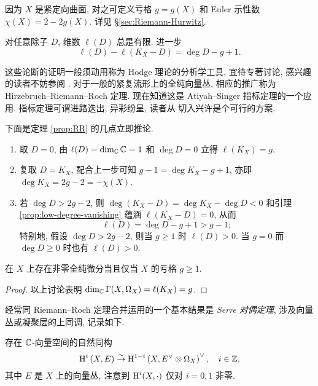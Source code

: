 因为 $X$ 是紧定向曲面, 对之可定义亏格 $g = g(X)$ 和 Euler 示性数 $\chi(X) = 2 - 2g(X)$. 详见 \S\ref{sec:Riemann-Hurwitz}.

\begin{theorem}\label{prop:RR} 
	对任意除子 $D$, 维数 $\ell(D)$ 总是有限. 进一步
	\[ \ell(D) - \ell(K_X - D) = \deg D - g + 1. \]
\end{theorem}

这些论断的证明一般须动用称为 Hodge 理论的分析学工具, 宜待专著讨论, 感兴趣的读者不妨参阅 \cite[第三章]{Mei13}. 对于一般的紧复流形上的全纯向量丛, 相应的推广称为 Hirzebruch--Riemann--Roch 定理. 现在知道这是 Atiyah--Singer 指标定理的一个应用. 指标定理可谓进路迭出, 异彩纷呈, 读者从 \cite[Theorem 4.10]{BGV04} 切入兴许是个可行的方案.

\begin{remark}\label{rem:RR}
	下面是定理 \ref{prop:RR} 的几点立即推论.
	\begin{enumerate}
		\item 取 $D=0$, 由 $\ell(D) = \dim_{\mathbb{C}} \mathbb{C} = 1$ 和 $\deg D = 0$ 立得 $\ell(K_X) = g$.
		\item 复取 $D=K_X$, 配合上一步可知 $g-1 = \deg K_X - g + 1$, 亦即 $\deg K_X = 2g - 2 = -\chi(X)$.
		\item 若 $\deg D > 2g-2$, 则 $\deg(K_X-D) = \deg K_X - \deg D < 0$ 和引理 \ref{prop:low-degree-vanishing} 蕴涵 $\ell(K_X-D) = 0$, 从而
		\[ \ell(D) = \deg D - g + 1 > g-1; \]
		特别地, 假设 $\deg D > 2g-2$, 则当 $g \geq 1$ 时 $\ell(D) > 0$. 当 $g=0$ 而 $\deg D \geq 0$ 时也有 $\ell(D) > 0$.
	\end{enumerate}
\end{remark}

\begin{corollary}
	在 $X$ 上存在非零全纯微分当且仅当 $X$ 的亏格 $g \geq 1$.
\end{corollary}
\begin{proof}
	以上讨论表明 $\dim_{\mathbb{C}} \Gamma(X, \Omega_X) = \ell(K_X) = g$.
\end{proof}

经常同 Riemann--Roch 定理合并运用的一个基本结果是 \emph{Serre 对偶定理}, 涉及向量丛或凝聚层的上同调, 记录如下.
\begin{theorem}[J.-P.\ Serre]\label{prop:Serre-duality} 
	存在 $\mathbb{C}$-向量空间的自然同构
	\[ \operatorname{H}^i\left(X, E\right) \stackrel{\sim}{\rightarrow} \operatorname{H}^{1-i}\left(X, E^\vee \otimes \Omega_X \right)^\vee, \quad i \in \mathbb{Z}, \]
	其中 $E$ 是 $X$ 上的向量丛, 注意到 $\operatorname{H}^i(X, \cdot)$ 仅对 $i = 0, 1$ 非零.
\end{theorem}

